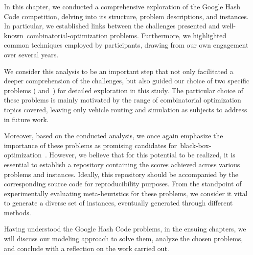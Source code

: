 In this chapter, we conducted a comprehensive exploration of the Google Hash
Code competition, delving into its structure, problem descriptions, and
instances. In particular, we established links between the challenges presented
and well-known~\acrshort{combinatorial-optimization} problems. Furthermore, we
highlighted common techniques employed by participants, drawing from our own
engagement over several years.

We consider this analysis to be an important step that not only facilitated a
deeper comprehension of the challenges, but also guided our choice of two
specific problems (
and~) for detailed exploration in
this study. The particular choice of these problems is mainly motivated by the
range of combinatorial optimization topics covered, leaving only vehicle routing
and simulation as subjects to address in future work.

Moreover, based on the conducted analysis, we once again emphasize the
importance of these problems as promising candidates
for~\acrshort{black-box-optimization}~\cite{bartz-beielstein2020benchmarking}.
However, we believe that for this potential to be realized, it is essential to
establish a repository containing the scores achieved across various problems
and instances. Ideally, this repository should be accompanied by the
corresponding source code for reproducibility purposes. From the standpoint of
experimentally evaluating meta-heuristics for these problems, we consider it
vital to generate a diverse set of instances, eventually generated through
different methods.

Having understood the Google Hash Code problems, in the ensuing chapters, we
will discuss our modeling approach to solve them, analyze the chosen problems,
and conclude with a reflection on the work carried out.